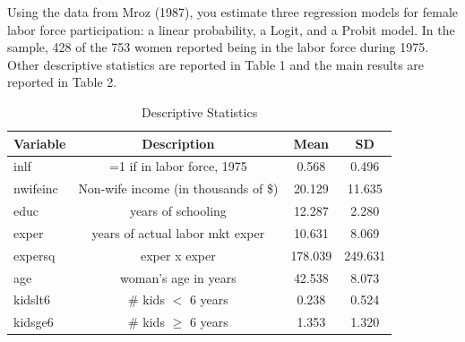 \documentclass{article}
\begin{document}
Using the data from Mroz (1987), you estimate three regression models for female labor force participation: a linear probability, a Logit, and a Probit model. In the sample, 428 of the 753 women reported being in the labor force during 1975. Other descriptive statistics are reported in Table 1 and the main results are reported in Table 2.


\begin{center}
\begin{table}[hbtp!]
\centering
\caption{Descriptive Statistics}
\begin{tabular}{|l|c|c|c|}
\hline
Variable    & Description                          & Mean       & SD         \\ \hline
inlf & =1 if in labor force, 1975 & 0.568 & 0.496 \\
nwifeinc & Non-wife income (in thousands of \$) & 20.129  & 11.635  \\
educ     & years of schooling                   & 12.287  & 2.280   \\
exper    & years of actual labor mkt exper      & 10.631  & 8.069   \\
expersq  & exper x exper                        & 178.039 & 249.631 \\
age      & woman's age in years                 & 42.538  & 8.073   \\
kidslt6  & \# kids $<$ 6 years            & 0.238   & 0.524   \\
kidsge6  & \# kids $\geq$ 6 years         & 1.353   & 1.320  \\ \hline
\end{tabular}
\end{table}
\end{center}
\end{document}
